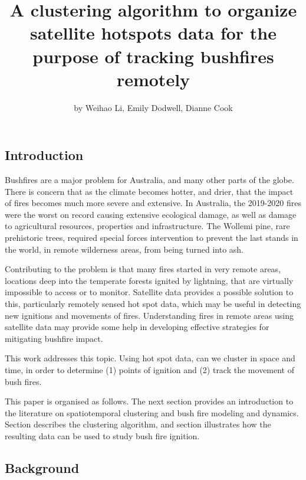 \title{A clustering algorithm to organize satellite hotspots data for the
purpose of tracking bushfires remotely}
\author{by Weihao Li, Emily Dodwell, Dianne Cook}

\maketitle


\hypertarget{introduction}{%
\subsection{Introduction}\label{introduction}}

Bushfires are a major problem for Australia, and many other parts of the
globe. There is concern that as the climate becomes hotter, and drier,
that the impact of fires becomes much more severe and extensive. In
Australia, the 2019-2020 fires were the worst on record causing
extensive ecological damage, as well as damage to agricultural
resources, properties and infrastructure. The Wollemi pine, rare
prehistoric trees, required special forces intervention to prevent the
last stands in the world, in remote wilderness areas, from being turned
into ash.

Contributing to the problem is that many fires started in very remote
areas, locations deep into the temperate forests ignited by lightning,
that are virtually impossible to access or to monitor. Satellite data
provides a possible solution to this, particularly remotely sensed hot
spot data, which may be useful in detecting new ignitions and movements
of fires. Understanding fires in remote areas using satellite data may
provide some help in developing effective strategies for mitigating
bushfire impact.

This work addresses this topic. Using hot spot data, can we cluster in
space and time, in order to determine (1) points of ignition and (2)
track the movement of bush fires.

This paper is organised as follows. The next section provides an
introduction to the literature on spatiotemporal clustering and bush
fire modeling and dynamics. Section \citet{algorithm} describes the
clustering algorithm, and section \citet{application} illustrates how
the resulting data can be used to study bush fire ignition.

\hypertarget{background}{%
\subsection{Background}\label{background}}

